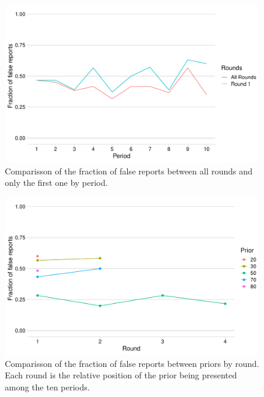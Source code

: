 \documentclass[12pt,a4paper]{article}
\begin{document}
	\begin{figure}
	\centering
	\includegraphics[scale=0.75]{../../results/fig2A_round_one.pdf}
	\caption{Comparisson of the fraction of false reports between all rounds and only the first one by period.}
	\label{fig:fig2b_rounds}
	\end{figure}
	
	\begin{figure}
		\centering
		\includegraphics[scale=0.75]{../../results/rounds_all_priors.pdf}
		\caption{Comparisson of the fraction of false reports between priors by round. Each round is the relative position of the prior being presented among the ten periods.}
		\label{fig:rounds_priors}
	\end{figure}
\end{document}
